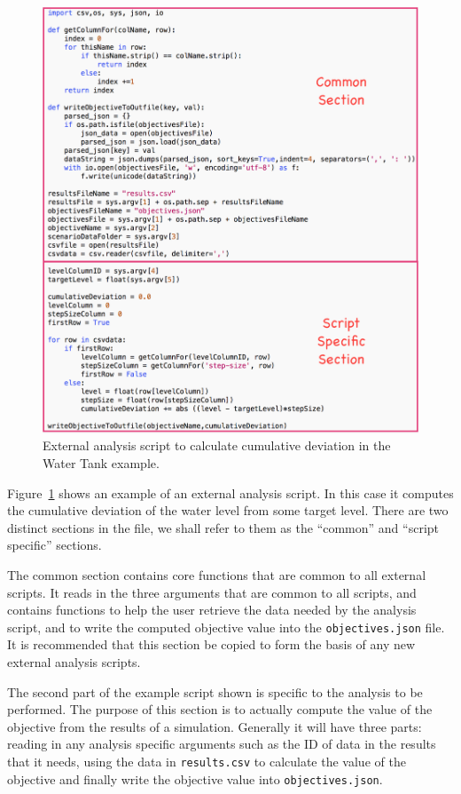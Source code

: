 \begin{figure}
	\centering
	\includegraphics[scale=0.55]{figures/dse/cumulativeDeviationWholeScript}
	\caption{External analysis script to calculate cumulative deviation in the Water Tank example.}\label{fig:dse:edit:cumulativeDeviationWholeScript}
\end{figure}


Figure~\ref{fig:dse:edit:cumulativeDeviationWholeScript} shows an example of an external analysis script.  In this case it computes the cumulative deviation of the water level from some target level.  There are two distinct sections in the file, we shall refer to them as the ``common'' and ``script specific'' sections.  

The common section contains core functions that are common to all external scripts.  It reads in the three arguments that are common to all scripts, and contains functions to help the user retrieve the data needed by the analysis script, and to write the computed objective value into the \texttt{objectives.json} file.  It is recommended that this section be copied to form the basis of any new external analysis scripts.

The second part of the example script shown is specific to the analysis to be performed.  The purpose of this section is to actually compute the value of the objective from the results of a simulation.  Generally it will have three parts: reading in any analysis specific arguments such as the ID of data in the results that it needs, using the data in \texttt{results.csv} to calculate the value of the objective and finally write the objective value into \texttt{objectives.json}.


